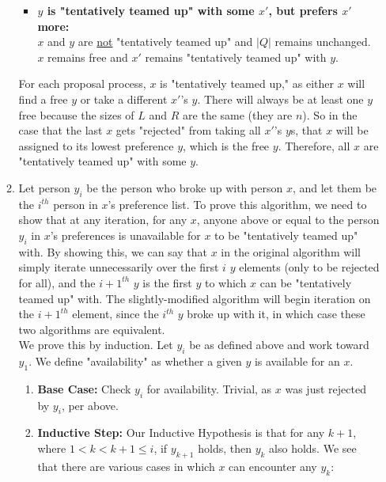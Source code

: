 \documentclass{article}
\begin{document}
\begin{enumerate}
\begin{enumerate}
\begin{itemize}
                \item \textbf{$y$ is "tentatively teamed up" with some $x'$, but prefers $x'$ more:} \\
                $x$ and $y$ are \underline{not} "tentatively teamed up" and $|Q|$ remains unchanged. $x$ remains free and $x'$ remains "tentatively teamed up" with $y$.
                
            \end{itemize}
            
            For each proposal process, $x$ is "tentatively teamed up," as either $x$ will find a free $y$ or take a different $x'$'s $y$. There will always be at least one $y$ free because the sizes of $L$ and $R$ are the same (they are $n$). So in the case that the last $x$ gets "rejected" from taking all $x'$'s $y$s, that $x$ will be assigned to its lowest preference $y$, which is the free $y$. Therefore, all $x$ are "tentatively teamed up" with some $y$.
            
        \item 
        Let person $y_i$ be the person who broke up with person $x$, and let them be the $i^{th}$ person in $x$'s preference list. To prove this algorithm, we need to show that at any iteration, for any $x$, anyone above or equal to the person $y_i$ in $x$'s preferences is unavailable for $x$ to be "tentatively teamed up" with. By showing this, we can say that $x$ in the original algorithm will simply iterate unnecessarily over the first $i$ $y$ elements (only to be rejected for all), and the $i+1^{th}$ $y$ is the first $y$ to which $x$ can be "tentatively teamed up" with. The slightly-modified algorithm will begin iteration on the $i+1^{th}$ element, since the $i^{th}$ $y$ broke up with it, in which case these two algorithms are equivalent. \\
        
        We prove this by induction. Let $y_i$ be as defined above and work toward $y_1$. We define "availability" as whether a given $y$ is available for an $x$.
        \begin{enumerate}
            \item \textbf{Base Case:} Check $y_i$ for availability. Trivial, as $x$ was just rejected by $y_i$, per above. 
            
            \item \textbf{Inductive Step:} 
            Our Inductive Hypothesis is that for any $k + 1$, where $1 < k < k + 1 \leq i$, if $y_{k + 1}$ holds, then $y_{k}$ also holds. We see that there are various cases in which $x$ can encounter any $y_k$: 
            

\end{enumerate}
\end{enumerate}
\end{enumerate}
\end{document}
